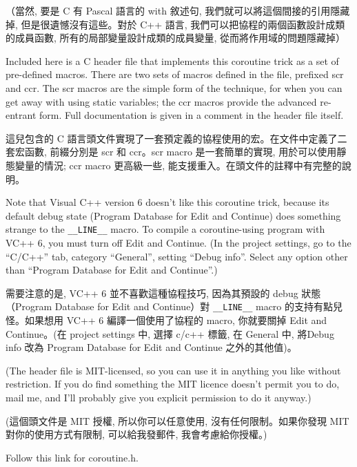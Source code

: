 \documentclass[12pt]{article}
\begin{document}
\begin{CJK}{UTF8}{bsmi}
（當然, 要是 C 有 Pascal 語言的 with 敘述句, 我們就可以將這個間接的引用隱藏掉, 但是很遺憾沒有這些。對於 C++
語言, 我們可以把協程的兩個函數設計成類的成員函數, 所有的局部變量設計成類的成員變量, 從而將作用域的問題隱藏掉） 

Included here is a C header file that implements this coroutine trick as a set of pre-defined macros. There are two sets of macros defined in the file, prefixed scr and ccr. The scr macros are the simple form of the technique, for when you can get away with using static variables; the ccr macros provide the advanced re-entrant form. Full documentation is given in a comment in the header file itself.

這兒包含的 C 語言頭文件實現了一套預定義的協程使用的宏。在文件中定義了二套宏函數, 前綴分別是 scr 和 ccr。scr macro 是一套簡單的實現, 用於可以使用靜態變量的情況; ccr macro 更高級一些, 能支援重入。在頭文件的註釋中有完整的說明。 

Note that Visual C++ version 6 doesn't like this coroutine trick, because its default debug state (Program Database for Edit and Continue) does something strange to the
\verb+__LINE__+ macro. To compile a coroutine-using program with VC++ 6, you must turn off Edit and Continue. (In the project settings, go to the ``C/C++'' tab, category ``General'', setting ``Debug info''. Select any option other than ``Program Database for Edit and Continue''.)

需要注意的是, VC++ 6 並不喜歡這種協程技巧, 因為其預設的 debug 狀態（Program Database for Edit and Continue）對 \verb+__LINE__+ macro
的支持有點兒怪。如果想用 VC++ 6 編譯一個使用了協程的 macro, 你就要關掉 Edit and Continue。(在 project settings 中, 選擇 c/c++ 標籤,
在 General 中, 將Debug info 改為 Program Database for Edit and Continue 之外的其他值)。 

(The header file is MIT-licensed, so you can use it in anything you like without restriction. If you do find something the MIT licence doesn't permit you to do, mail me, and I'll probably give you explicit permission to do it anyway.)

(這個頭文件是 MIT 授權, 所以你可以任意使用, 沒有任何限制。如果你發現 MIT 對你的使用方式有限制, 可以給我發郵件, 我會考慮給你授權。)

Follow this link for coroutine.h.

%



\end{CJK}
\end{document}
